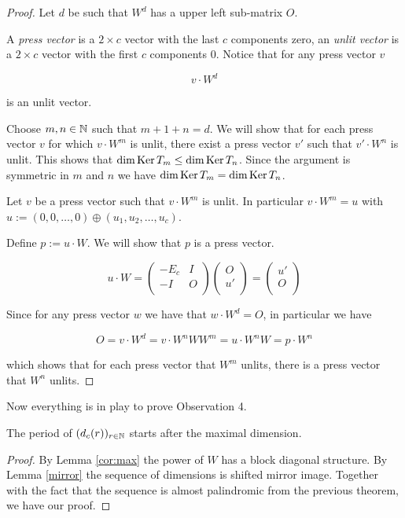 \begin{proof}
  Let $d$ be such that $W^d$ has a upper left sub-matrix $O$.

  A \emph{press vector} is a $2\times c$ vector with the last $c$ components zero, an \emph{unlit vector} is a $2\times c$ vector with the first $c$ components 0. Notice that for any press vector $v$

  \[
    v\cdot W^d
  \]

  is an unlit vector.

  Choose $m,n\in\mathbb{N}$ such that $m + 1 + n = d$. We will show that for each press vector $v$ for which $v\cdot W^m$ is unlit, there exist a press vector $v'$ such that $v'\cdot W^n$ is unlit.
  This shows that $\dim\operatorname{Ker} T_{m} \leq \dim\operatorname{Ker} T_{n}$. Since the argument is symmetric in $m$ and $n$ we have $\dim\operatorname{Ker} T_{m} = \dim\operatorname{Ker} T_{n}$.

	Let $v$ be a press vector such that $v\cdot W^{m}$ is unlit. In particular $v\cdot W^{m} = u$ with $u := (0,0,\ldots, 0)\oplus (u_{1}, u_{2}, \ldots, u_{c})$.

  Define $p := u\cdot W$. We will show that $p$ is a press vector.

  \[
    u\cdot W = \left(
    \begin{array}{cc}
      -E_{c} & I \\
      -I    & O \\
    \end{array}
    \right)
    \left(
    \begin{array}{c}
      O  \\
      u' \\
    \end{array}
    \right)
    =
    \left(
    \begin{array}{c}
      u' \\
      O  \\
    \end{array}
    \right)
  \]

  Since for any press vector $w$ we have that $w\cdot W^{d} = O$, in particular we have

  \[
  O = v\cdot W^{d} = v\cdot W^{n} W W^{m} = u\cdot W^{n} W = p\cdot W^{n}
  \]

  which shows that for each press vector that $W^{m}$ unlits, there is a press vector that $W^{n}$ unlits.
\end{proof}

Now everything is in play to prove Observation 4.

\begin{theorem}[Observation 4]
	The period of $(d_{c}(r))_{r\in\mathbb{N}}$ starts after the maximal dimension.
\end{theorem}

\begin{proof}
By Lemma \ref{cor:max} the power of $W$ has a block diagonal structure. By Lemma \ref{mirror} the sequence of dimensions
is shifted mirror image. Together with the fact that the sequence is almost palindromic from the previous theorem, we have our proof.
\end{proof}
